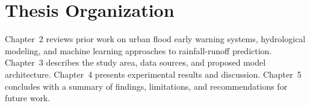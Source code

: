 \section{Thesis Organization}
Chapter~2 reviews prior work on urban flood early warning systems, hydrological modeling, and machine learning approaches to rainfall-runoff prediction. Chapter~3 describes the study area, data sources, and proposed model architecture. Chapter~4 presents experimental results and discussion. Chapter~5 concludes with a summary of findings, limitations, and recommendations for future work.

